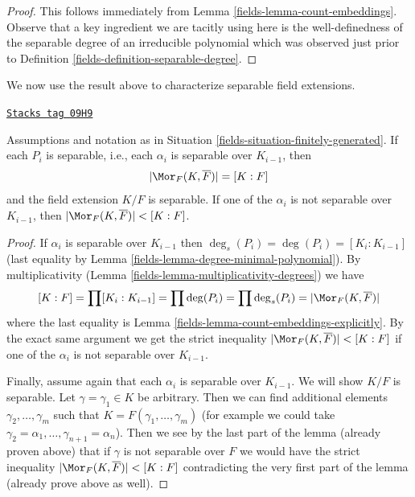 \begin{proof}

This follows immediately from Lemma \ref{fields-lemma-count-embeddings}.
Observe that a key ingredient we are tacitly using here is the
well-definedness of the separable degree of an irreducible polynomial
which was observed just prior to
Definition \ref{fields-definition-separable-degree}.
\end{proof}

We now use the result above to characterize separable field extensions.

\begin{lemma}
\label{fields-lemma-separably-generated-separable}
\href{https://stacks.math.columbia.edu/tag/09H9}{\texttt{Stacks tag 09H9}}

Assumptions and notation as in Situation \ref{fields-situation-finitely-generated}.
If each $P_i$ is separable, i.e., each $\alpha_i$ is separable over
$K_{i - 1}$, then
$$
|\Mor_F(K, \overline{F})| = [K : F]
$$
and the field extension $K/F$ is separable. If one of the $\alpha_i$ is
not separable over $K_{i - 1}$, then
$|\Mor_F(K, \overline{F})| < [K : F]$.
\end{lemma}

\begin{proof}

If $\alpha_i$ is separable over $K_{i - 1}$ then
$\deg_s(P_i) = \deg(P_i) = [K_i : K_{i - 1}]$
(last equality by Lemma \ref{fields-lemma-degree-minimal-polynomial}).
By multiplicativity (Lemma \ref{fields-lemma-multiplicativity-degrees}) we have
$$
[K : F] = \prod [K_i : K_{i - 1}] = \prod \deg(P_i) =
\prod \deg_s(P_i) = |\Mor_F(K, \overline{F})|
$$
where the last equality is Lemma \ref{fields-lemma-count-embeddings-explicitly}.
By the exact same argument we get the strict inequality
$|\Mor_F(K, \overline{F})| < [K : F]$ if one of the $\alpha_i$ is
not separable over $K_{i - 1}$.

\medskip\noindent
Finally, assume again that each $\alpha_i$ is separable over $K_{i - 1}$.
We will show $K/F$ is separable.
Let $\gamma = \gamma_1 \in K$ be arbitrary. Then we can find additional
elements $\gamma_2, \ldots, \gamma_m$ such that
$K = F(\gamma_1, \ldots, \gamma_m)$ (for example we could take
$\gamma_2 = \alpha_1, \ldots, \gamma_{n + 1} = \alpha_n$).
Then we see by the last part of the lemma (already proven above)
that if $\gamma$ is not separable over $F$ we would have the
strict inequality $|\Mor_F(K, \overline{F})| < [K : F]$
contradicting the very first part of the lemma (already prove above
as well).
\end{proof}

